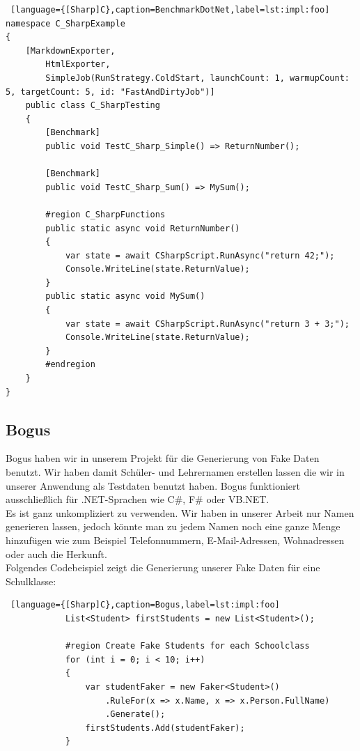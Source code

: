 \begin{lstlisting} [language={[Sharp]C},caption=BenchmarkDotNet,label=lst:impl:foo]
namespace C_SharpExample
{
    [MarkdownExporter,
        HtmlExporter,
        SimpleJob(RunStrategy.ColdStart, launchCount: 1, warmupCount: 5, targetCount: 5, id: "FastAndDirtyJob")]
    public class C_SharpTesting
    {
        [Benchmark]
        public void TestC_Sharp_Simple() => ReturnNumber();

        [Benchmark]
        public void TestC_Sharp_Sum() => MySum();

        #region C_SharpFunctions
        public static async void ReturnNumber()
        {
            var state = await CSharpScript.RunAsync("return 42;");
            Console.WriteLine(state.ReturnValue);
        }
        public static async void MySum()
        {
            var state = await CSharpScript.RunAsync("return 3 + 3;");
            Console.WriteLine(state.ReturnValue);
        }
        #endregion
    }
}
\end{lstlisting}

\newpage
\subsection*{Bogus}

Bogus haben wir in unserem Projekt für die Generierung von Fake Daten benutzt. 
Wir haben damit Schüler- und Lehrernamen erstellen lassen die wir in unserer Anwendung als 
Testdaten benutzt haben. Bogus funktioniert ausschließlich für 
.NET-Sprachen wie C\#, F\# oder VB.NET. \\

Es ist ganz unkompliziert zu verwenden. Wir haben in unserer Arbeit nur Namen generieren lassen, 
jedoch könnte man zu jedem Namen noch eine ganze Menge hinzufügen wie zum Beispiel 
Telefonnummern, E-Mail-Adressen, Wohnadressen oder auch die Herkunft.\\

Folgendes Codebeispiel zeigt die Generierung unserer Fake Daten für eine Schulklasse:\\

\begin{lstlisting} [language={[Sharp]C},caption=Bogus,label=lst:impl:foo]
            List<Student> firstStudents = new List<Student>();
                      
            #region Create Fake Students for each Schoolclass
            for (int i = 0; i < 10; i++)
            {
                var studentFaker = new Faker<Student>()
                    .RuleFor(x => x.Name, x => x.Person.FullName)
                    .Generate();
                firstStudents.Add(studentFaker);
            }
\end{lstlisting}


